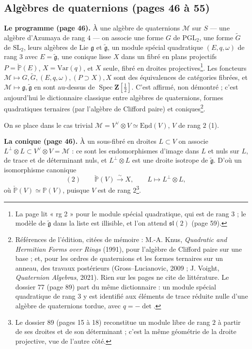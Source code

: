 \documentclass[11pt,a4paper]{article}
\begin{document}
\subsection*{Algèbres de quaternions (pages 46 à 55)}

\textbf{Le programme (page 46).} À une algèbre de quaternions $\mathcal{M}$ sur $S$ — une
algèbre d'Azumaya de rang $4$ — on associe une forme $G$ de $\mathrm{PGL}_2$, une
forme $\widetilde{G}$ de $\mathrm{SL}_2$, leurs algèbres de Lie $\mathfrak{g}$ et
$\widetilde{\mathfrak{g}}$, un module spécial quadratique $(E, q, \omega)$ de rang $3$
avec $E = \widetilde{\mathfrak{g}}$, une conique lisse $X$ dans un fibré en plans
projectifs $P = \check{\mathbb{P}}(E)$, $X = \mathrm{Var}(q)$, et $X$ seule, fibré en
droites projectives\footnote{La page lit « rg 2 » pour le module spécial
quadratique, qui est de rang $3$ ; le modèle de $\widetilde{\mathfrak{g}}$ dans la liste
est illisible, et l'on attend $\mathfrak{sl}(2)$ (page 59).}. Les foncteurs
$\mathcal{M} \mapsto G, \widetilde{G}, (E, q, \omega), (P \supset X), X$ sont des
équivalences de catégories fibrées, et $\mathcal{M} \mapsto \mathfrak{g},
\widetilde{\mathfrak{g}}$ en sont au-dessus de $\operatorname{Spec}\mathbf{Z}[\tfrac{1}{2}]$.
C'est affirmé, non démontré ; c'est aujourd'hui le dictionnaire classique entre
algèbres de quaternions, formes quadratiques ternaires (par l'algèbre de Clifford
paire) et coniques\footnote{Références de l'édition, citées de mémoire : M.-A.
Knus, \emph{Quadratic and Hermitian Forms over Rings} (1991), pour l'algèbre de
Clifford paire sur une base ; et, pour les ordres de quaternions et les formes
ternaires sur un anneau, des travaux postérieurs (Gross--Lucianovic, 2009 ;
J. Voight, \emph{Quaternion Algebras}, 2021). Rien sur les pages ne cite de
littérature. Le dossier 77 (page 89) part du même dictionnaire : un module
spécial quadratique de rang $3$ y est identifié aux éléments de trace réduite
nulle d'une algèbre de quaternions tordue, avec $q = -\det$.}.

On se place dans le cas trivial $\mathcal{M} = V^{\vee} \otimes V \simeq
\underline{\mathrm{End}}(V)$, $V$ de rang $2$ (1).

\textbf{La conique (page 46).} À un sous-fibré en droites $L \subset V$ on associe
$L^{\perp} \otimes L \subset V^{\vee} \otimes V = \mathcal{M}$ : ce sont les endomorphismes
d'image dans $L$ et nuls sur $L$, de trace et de déterminant nuls, et
$L^{\perp} \otimes L$ est une droite isotrope de $\widetilde{\mathfrak{g}}$. D'où un
isomorphisme canonique
\[
  (2) \qquad \check{\mathbb{P}}(V) \xrightarrow{\ \sim\ } X , \qquad L \longmapsto L^{\perp} \otimes L ,
\]
où $\check{\mathbb{P}}(V) \simeq \mathbb{P}(V)$, puisque $V$ est de rang $2$\footnote{Le
dossier 89 (pages 15 à 18) reconstitue un module libre de rang $2$ à partir de
ses droites et de son déterminant ; c'est la même géométrie de la droite
projective, vue de l'autre côté.}.
\end{document}
